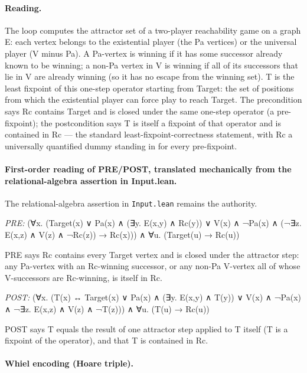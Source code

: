 \documentclass[10pt]{article}
\begin{document}
\paragraph{Reading.} The loop computes the attractor set of a two-player reachability game on a graph E: each vertex belongs to the existential player (the Pa vertices) or the universal player (V minus Pa). A Pa-vertex is winning if it has some successor already known to be winning; a non-Pa vertex in V is winning if all of its successors that lie in V are already winning (so it has no escape from the winning set). T is the least fixpoint of this one-step operator starting from Target: the set of positions from which the existential player can force play to reach Target. The precondition says Rc contains Target and is closed under the same one-step operator (a pre-fixpoint); the postcondition says T is itself a fixpoint of that operator and is contained in Rc --- the standard least-fixpoint-correctness statement, with Rc a universally quantified dummy standing in for every pre-fixpoint.

\paragraph{First-order reading of PRE/POST, translated mechanically from the relational-algebra assertion in Input.lean.} The relational-algebra assertion in \texttt{Input.lean} remains the authority.

\textit{PRE:} (∀x. (Target(x) ∨ Pa(x) ∧ (∃y. E(x,y) ∧ Rc(y)) ∨ V(x) ∧ ¬Pa(x) ∧ (¬∃z. E(x,z) ∧ V(z) ∧ ¬Rc(z)) → Rc(x))) ∧ ∀u. (Target(u) → Rc(u))\par PRE says Rc contains every Target vertex and is closed under the attractor step: any Pa-vertex with an Rc-winning successor, or any non-Pa V-vertex all of whose V-successors are Rc-winning, is itself in Rc.

\textit{POST:} (∀x. (T(x) ↔ Target(x) ∨ Pa(x) ∧ (∃y. E(x,y) ∧ T(y)) ∨ V(x) ∧ ¬Pa(x) ∧ ¬∃z. E(x,z) ∧ V(z) ∧ ¬T(z))) ∧ ∀u. (T(u) → Rc(u))\par POST says T equals the result of one attractor step applied to T itself (T is a fixpoint of the operator), and that T is contained in Rc.

\paragraph{Whiel encoding (Hoare triple).}
\end{document}

